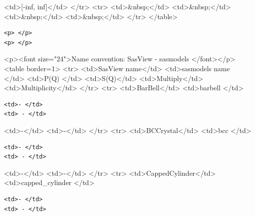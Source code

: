 \textless{}td\textgreater{}[-inf, inf]\textless{}/td\textgreater{} \textless{}/tr\textgreater{} \textless{}tr\textgreater{} \textless{}td\textgreater{}\&nbsp;\textless{}/td\textgreater{} \textless{}td\textgreater{}\&nbsp;\textless{}/td\textgreater{} \textless{}td\textgreater{}\&nbsp;\textless{}/td\textgreater{} \textless{}td\textgreater{}\&nbsp;\textless{}/td\textgreater{} \textless{}/tr\textgreater{} \textless{}/table\textgreater{}

\begin{verbatim}
<p> </p>
<p> </p>
\end{verbatim}

\textless{}p\textgreater{}\textless{}font size="24"\textgreater{}Name convention: SasView - sasmodels \textless{}/font\textgreater{}\textless{}/p\textgreater{} \textless{}table border=1\textgreater{} \textless{}tr\textgreater{} \textless{}td\textgreater{}SasView name\textless{}/td\textgreater{} \textless{}td\textgreater{}sasmodels name \textless{}/td\textgreater{} \textless{}td\textgreater{}P(Q) \textless{}/td\textgreater{} \textless{}td\textgreater{}S(Q)\textless{}/td\textgreater{} \textless{}td\textgreater{}Multiply\textless{}/td\textgreater{} \textless{}td\textgreater{}Multiplicity\textless{}/td\textgreater{} \textless{}/tr\textgreater{} \textless{}tr\textgreater{} \textless{}td\textgreater{}BarBell\textless{}/td\textgreater{} \textless{}td\textgreater{}barbell \textless{}/td\textgreater{}

\begin{verbatim}
<td>- </td>
<td> - </td>
\end{verbatim}

\textless{}td\textgreater{}-\textless{}/td\textgreater{} \textless{}td\textgreater{}-\textless{}/td\textgreater{} \textless{}/tr\textgreater{} \textless{}tr\textgreater{} \textless{}td\textgreater{}BCCrystal\textless{}/td\textgreater{} \textless{}td\textgreater{}bcc \textless{}/td\textgreater{}

\begin{verbatim}
<td>- </td>
<td> - </td>
\end{verbatim}

\textless{}td\textgreater{}-\textless{}/td\textgreater{} \textless{}td\textgreater{}-\textless{}/td\textgreater{} \textless{}/tr\textgreater{} \textless{}tr\textgreater{} \textless{}td\textgreater{}CappedCylinder\textless{}/td\textgreater{} \textless{}td\textgreater{}capped\_cylinder \textless{}/td\textgreater{}

\begin{verbatim}
<td>- </td>
<td> - </td>
\end{verbatim}

